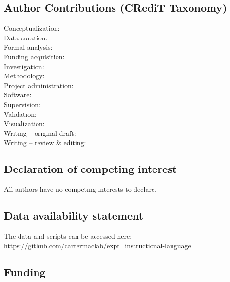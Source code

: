 \documentclass[
  man, donotrepeattitle,mask,floatsintext]{apa7}
\begin{document}
\newpage

\hypertarget{author-contributions-credit-taxonomy}{%
\subsection{Author Contributions (CRediT Taxonomy)}\label{author-contributions-credit-taxonomy}}

\noindent Conceptualization: \\
\noindent Data curation: \\
\noindent Formal analysis: \\
\noindent Funding acquisition: \\
\noindent Investigation: \\
\noindent Methodology: \\
\noindent Project administration: \\
\noindent Software: \\
\noindent Supervision: \\
\noindent Validation: \\
\noindent Visualization: \\
\noindent Writing -- original draft: \\
\noindent Writing -- review \& editing: 

\hypertarget{declaration-of-competing-interest}{%
\subsection{Declaration of competing interest}\label{declaration-of-competing-interest}}

\noindent All authors have no competing interests to declare.

\hypertarget{data-availability-statement}{%
\subsection{Data availability statement}\label{data-availability-statement}}

\noindent The data and scripts can be accessed here: \url{https://github.com/cartermaclab/expt_instructional-language}.

\hypertarget{funding}{%
\subsection{Funding}\label{funding}}
\end{document}
